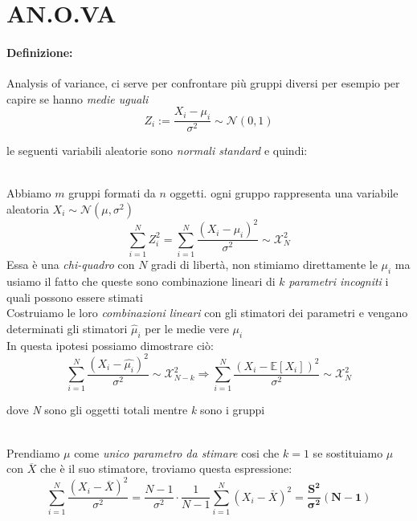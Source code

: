 \documentclass[]{article}
\newcommand{\ev}{\mathbb{E}[X]}
\renewcommand{\ev}[1]{\mathbb{E}\left[#1\right]}
\newcommand{\definizione}{\paragraph{Definizione:}}
\begin{document}
    \section{AN.O.VA} 
    \definizione Analysis of variance, ci serve per confrontare più gruppi diversi per esempio per capire se hanno \textit{medie uguali}
    \[ Z_i := \frac{X_i - \mu_i}{\sigma^2} \sim \mathcal{N}(0,1) \]
    \centerline{le seguenti variabili aleatorie sono \textit{normali standard} e quindi:} \\[2ex]
    Abbiamo $m$ gruppi formati da $n$ oggetti. ogni gruppo rappresenta una variabile aleatoria $X_i \sim \mathcal{N}(\mu, \sigma^2)$
    \[ \sum_{i=1}^{N} Z^2_i = \sum_{i=1}^{N} \frac{(X_i - \mu_i)^2}{\sigma^2} \sim \mathcal{X}^2_N \]
    Essa è una \textit{chi-quadro} con $N$ gradi di libertà, non stimiamo direttamente le $\mu_i$ ma usiamo il fatto che queste sono combinazione lineari di $k$ \textit{parametri incogniti} i quali possono essere stimati \\
    Costruiamo le loro \textit{combinazioni lineari} con gli stimatori dei parametri e vengano determinati gli stimatori $\hat{\mu}_i$ per le medie vere $\mu_i$ \\
    In questa ipotesi possiamo dimostrare ciò:
    \[ \sum_{i=1}^{N} \frac{(X_i - \hat{\mu_i})^2}{\sigma^2} \sim \mathcal{X}^2_{N-k} \Longrightarrow \sum_{i=1}^{N} \frac{(X_i - \ev{X_i})^2}{\sigma^2} \sim \mathcal{X}^2_N \]
    \centerline{dove \textit{N} sono gli oggetti totali mentre \textit{k} sono i gruppi} \\[2ex]

    Prendiamo $\mu$ come \textit{unico parametro da stimare} cosi che $k=1$ se sostituiamo $\mu$ con $\overline{X}$ che è il suo stimatore, troviamo questa espressione:
    \[ \sum_{i=1}^{N} \frac{(X_i - \overline{X})^2}{\sigma^2} = \frac{N-1}{\sigma^2} \cdot \frac{1}{N-1} \sum_{i=1}^{N}(X_i - \overline{X})^2 = \boldsymbol{\frac{S^2}{\sigma^2}(N-1)} \]
\end{document}
